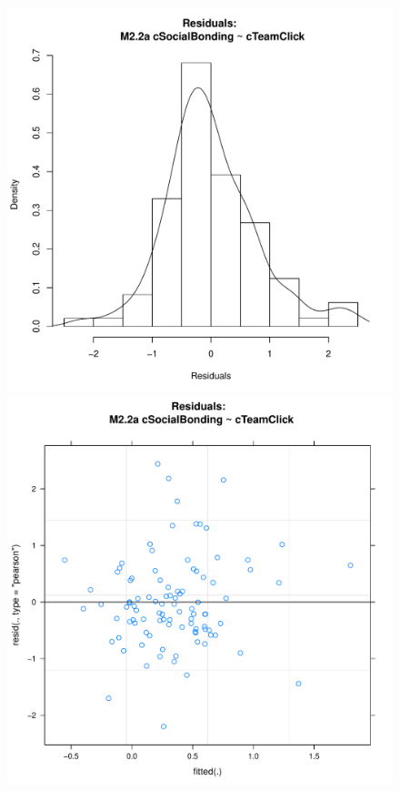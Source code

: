 \begin{CJK}{UTF8}{gbsn}


      

      \begin{figure}[htbp]
        \includegraphics[scale =.4]{images/MLM22aHist.pdf}
        \includegraphics[scale =.4]{images/MLM22aScatter.pdf}

\end{figure}
\end{CJK}
